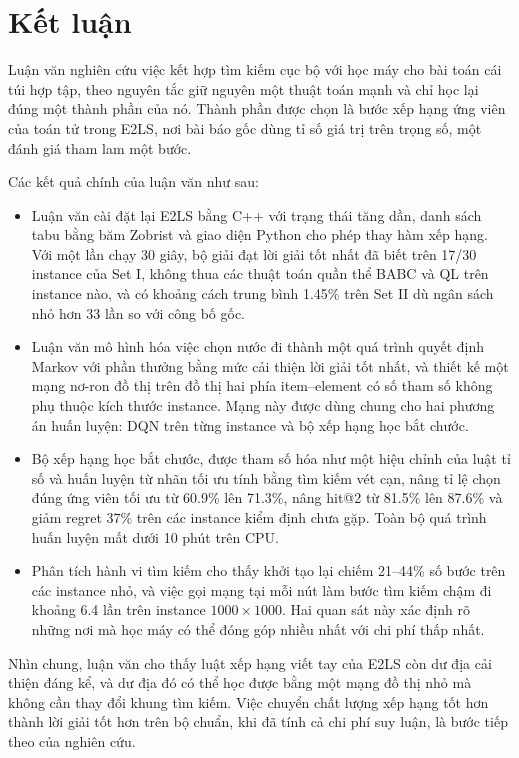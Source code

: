 \label{ch:chap5}

\section{Kết luận}

Luận văn nghiên cứu việc kết hợp tìm kiếm cục bộ với học máy cho bài toán cái túi hợp tập, theo nguyên tắc giữ nguyên một thuật toán mạnh và chỉ học lại đúng một thành phần của nó. Thành phần được chọn là bước xếp hạng ứng viên của toán tử \addstar trong E2LS, nơi bài báo gốc dùng tỉ số giá trị trên trọng số, một đánh giá tham lam một bước.

Các kết quả chính của luận văn như sau:
\begin{itemize}
  \item Luận văn cài đặt lại E2LS bằng C++ với trạng thái tăng dần, danh sách tabu bằng băm Zobrist và giao diện Python cho phép thay hàm xếp hạng. Với một lần chạy 30 giây, bộ giải đạt lời giải tốt nhất đã biết trên 17/30 instance của Set I, không thua các thuật toán quần thể BABC và QL trên instance nào, và có khoảng cách trung bình 1.45\% trên Set II dù ngân sách nhỏ hơn 33 lần so với công bố gốc.
  \item Luận văn mô hình hóa việc chọn nước đi thành một quá trình quyết định Markov với phần thưởng bằng mức cải thiện lời giải tốt nhất, và thiết kế một mạng nơ-ron đồ thị trên đồ thị hai phía item--element có số tham số không phụ thuộc kích thước instance. Mạng này được dùng chung cho hai phương án huấn luyện: DQN trên từng instance và bộ xếp hạng học bắt chước.
  \item Bộ xếp hạng học bắt chước, được tham số hóa như một hiệu chỉnh của luật tỉ số và huấn luyện từ nhãn tối ưu tính bằng tìm kiếm vét cạn, nâng tỉ lệ chọn đúng ứng viên tối ưu từ 60.9\% lên 71.3\%, nâng hit@2 từ 81.5\% lên 87.6\% và giảm regret 37\% trên các instance kiểm định chưa gặp. Toàn bộ quá trình huấn luyện mất dưới 10 phút trên CPU.
  \item Phân tích hành vi tìm kiếm cho thấy khởi tạo lại chiếm 21--44\% số bước trên các instance nhỏ, và việc gọi mạng tại mỗi nút \addstar làm bước tìm kiếm chậm đi khoảng 6.4 lần trên instance $1000\times1000$. Hai quan sát này xác định rõ những nơi mà học máy có thể đóng góp nhiều nhất với chi phí thấp nhất.
\end{itemize}

Nhìn chung, luận văn cho thấy luật xếp hạng viết tay của E2LS còn dư địa cải thiện đáng kể, và dư địa đó có thể học được bằng một mạng đồ thị nhỏ mà không cần thay đổi khung tìm kiếm. Việc chuyển chất lượng xếp hạng tốt hơn thành lời giải tốt hơn trên bộ chuẩn, khi đã tính cả chi phí suy luận, là bước tiếp theo của nghiên cứu.

